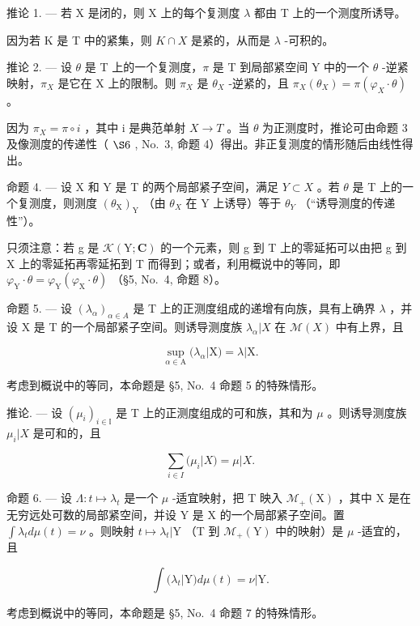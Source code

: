推论 1. --- 若 X 是闭的，则 X 上的每个复测度 \(\lambda\) 都由 T 上的一个测度所诱导。

因为若 K 是 T 中的紧集，则 \(K \cap X\) 是紧的，从而是 \(\lambda\) -可积的。

推论 2. --- 设 \(\theta\) 是 T 上的一个复测度，\(\pi\) 是 T 到局部紧空间 Y 中的一个 \(\theta\) -逆紧映射，\(\pi_{X}\) 是它在 X 上的限制。则 \(\pi_{X}\) 是 \(\theta_{X}\) -逆紧的，且 \(\pi_{X}(\theta_{X}) = \pi(\varphi_{X} \cdot \theta)\) 。

因为 \(\pi_{X} = \pi \circ i\) ，其中 i 是典范单射 \(X \to T\) 。当 \(\theta\) 为正测度时，推论可由命题 3 及像测度的传递性（ \(\S6\) , No.~3, 命题 4）得出。非正复测度的情形随后由线性得出。

命题 4. --- 设 X 和 Y 是 T 的两个局部紧子空间，满足 \(Y \subset X\) 。若 \(\theta\) 是 T 上的一个复测度，则测度 \((\theta_{\mathrm{X}})_{\mathrm{Y}}\) （由 \(\theta_{X}\) 在 Y 上诱导）等于 \(\theta_{Y}\) （“诱导测度的传递性”）。

只须注意：若 g 是 \(\mathcal{K}(\mathrm{Y};\mathbf{C})\) 的一个元素，则 g 到 T 上的零延拓可以由把 g 到 X 上的零延拓再零延拓到 T 而得到；或者，利用概说中的等同，即 \(\varphi_{\mathrm{Y}}\cdot\theta=\varphi_{\mathrm{Y}}(\varphi_{\mathrm{X}}\cdot\theta)\) （§5, No.~4, 命题 8）。

命题 5. --- 设 \((\lambda_{\alpha})_{\alpha\in A}\) 是 T 上的正测度组成的递增有向族，具有上确界 \(\lambda\) ，并设 X 是 T 的一个局部紧子空间。则诱导测度族 \(\lambda_{\alpha}|X\) 在 \(\mathcal{M}(X)\) 中有上界，且

\[
\sup _ {\alpha \in \mathrm{A}} (\lambda_ {\alpha} | \mathrm{X}) = \lambda | \mathrm{X}.\tag{8}
\]

考虑到概说中的等同，本命题是 §5, No.~4 命题 5 的特殊情形。

推论. --- 设 \((\mu_{i})_{i\in\mathbb{I}}\) 是 T 上的正测度组成的可和族，其和为 \(\mu\) 。则诱导测度族 \(\mu_{i}|X\) 是可和的，且

\[
\sum_ {i \in I} (\mu_ {i} | X) = \mu | X.\tag{9}
\]

命题 6. --- 设 \(\Lambda: t \mapsto \lambda_t\) 是一个 \(\mu\) -适宜映射，把 T 映入 \(\mathcal{M}_+(\mathrm{X})\) ，其中 X 是在无穷远处可数的局部紧空间，并设 Y 是 X 的一个局部紧子空间。置 \(\int \lambda_t d\mu(t) = \nu\) 。则映射 \(t \mapsto \lambda_t|\mathrm{Y}\) （T 到 \(\mathcal{M}_+(\mathrm{Y})\) 中的映射）是 \(\mu\) -适宜的，且

\[
\int (\lambda_ {t} | \mathrm{Y}) d \mu (t) = \nu | \mathrm{Y}.\tag{10}
\]

考虑到概说中的等同，本命题是 §5, No.~4 命题 7 的特殊情形。


